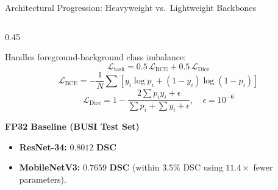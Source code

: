 \documentclass[aspectratio=169, 10pt]{beamer}
\begin{document}
\begin{frame}{Architectural Progression: Heavyweight vs.\ Lightweight Backbones}
\begin{columns}[T, onlytextwidth]
\begin{column}{0.45\textwidth}
    \begin{tcolorbox}[
    title={\textbf{Compound Loss Formulation}}, 
    colframe=MedBlue, %
    colback=white,          %
    coltitle=white,         %
    boxrule=1pt,            %
]
\scriptsize
    Handles foreground-background class imbalance:
    $$\mathcal{L}_{\text{task}} = 0.5\,\mathcal{L}_{\text{BCE}} + 0.5\,\mathcal{L}_{\text{Dice}}$$
    \vspace{-0.7em}
    $$\mathcal{L}_{\text{BCE}} = -\frac{1}{N}\sum \left[y_i \log p_i + (1-y_i)\log(1-p_i)\right]$$
    \vspace{-0.7em}
    $$\mathcal{L}_{\text{Dice}} = 1 - \frac{2 \sum p_i y_i + \epsilon}{\sum p_i + \sum y_i + \epsilon}, \quad \epsilon = 10^{-6}$$
\end{tcolorbox}

    \vspace{0.6em}

    \textbf{FP32 Baseline (BUSI Test Set)}
    \begin{itemize}\setlength{\itemsep}{3pt}\footnotesize
      \item \textbf{ResNet-34:} $\mathbf{0.8012\text{ DSC}}$
      \item \textbf{MobileNetV3:} $\mathbf{0.7659\text{ DSC}}$ (within $3.5\%$ DSC using $11.4\times$ fewer parameters).
    \end{itemize}
  \end{column}
\end{columns}
\end{frame}
\end{document}
